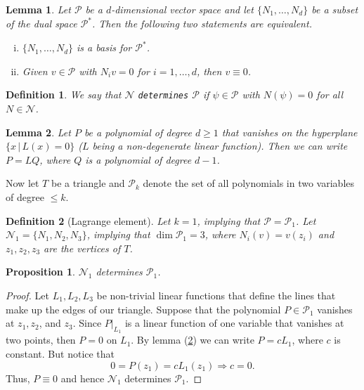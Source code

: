 \documentclass[11pt]{article}
\newtheorem{proposition}{Proposition}
\newtheorem{lemma}{Lemma}
\newtheorem{definition}{Definition}
\theoremstyle{definition}
\begin{document}
\begin{lemma}
	Let $\mathcal{P}$ be a $d$-dimensional vector space and let $\{N_1, \dots, N_d\}$ be a subset of the 
	dual space $\mathcal{P}^*$. Then the following two statements are equivalent.
	\begin{enumerate}[(i)]
		\item $\{N_1, \dots, N_d\}$ is a basis for $\mathcal{P}^*$.
		\item Given $v \in \mathcal{P}$ with $N_iv = 0$ for $i = 1, \dots, d$, then $v \equiv 0$.
	\end{enumerate}
\end{lemma}

\begin{definition}
	We say that $\mathcal{N}$ \texttt{determines} $\mathcal{P}$ if $\psi \in \mathcal{P}$ with $N(\psi) = 0$
	for all $N \in \mathcal{N}$.
\end{definition}

\begin{lemma}
	\label{lemma:asdkf}
	Let $P$ be a polynomial of degree $d \geq 1$ that vanishes on the hyperplane $\{x \, | \, L(x) = 0\}$
	($L$ being a non-degenerate linear function). Then we can write $P = LQ$, where $Q$ is a polynomial
	of degree $d-1$.
\end{lemma}

Now let $T$ be a triangle and $\mathcal{P}_k$ denote the set of all polynomials in two variables of degree $\leq k$.

\begin{definition}[Lagrange element]
	Let $k=1$, implying that $\mathcal{P} = \mathcal{P}_1$.
	Let $\mathcal{N}_1 = \{N_1, N_2, N_3\}$, implying that $\dim{\mathcal{P}_1} = 3$,
	where $N_i(v) = v(z_i)$ and $z_1,z_2,z_3$ are the vertices of $T$.
\end{definition}

\begin{proposition}
	$\mathcal{N}_1$ determines $\mathcal{P}_1$.
\end{proposition}
\begin{proof}
	Let $L_1,L_2,L_3$ be non-trivial linear functions that define the lines that make up the edges of our triangle.
	Suppose that the polynomial $P \in \mathcal{P}_1$ vanishes at $z_1,z_2$, and $z_3$.
	Since $P|_{L_1}$ is a linear function of one variable that vanishes at two points, then $P = 0$ on $L_1$.
	By lemma (\ref{lemma:asdkf}) we can write $P = cL_1$, where $c$ is constant. But notice that
	\begin{equation*}
		0 = P(z_1) = cL_1(z_1) \Rightarrow c= 0.
	\end{equation*}
	Thus, $P \equiv 0$ and hence $\mathcal{N}_1$ determines $\mathcal{P}_1$.
\end{proof}
\end{document}
